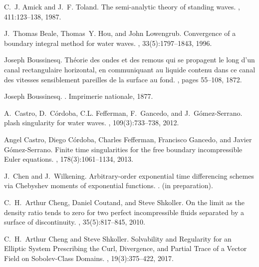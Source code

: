 \documentclass[11pt]{article}
\theoremstyle{plain}
\theoremstyle{definition}
\theoremstyle{definition}
\begin{document}
\begin{thebibliography}{10}
C.~J. Amick and J.~F. Toland.
\newblock The semi-analytic theory of standing waves.
, 411:123--138, 1987.

J.~Thomas Beale, Thomas~Y. Hou, and John Lowengrub.
\newblock Convergence of a boundary integral method for water waves.
, 33(5):1797--1843, 1996.

Joseph Boussinesq.
\newblock Th{\'e}orie des ondes et des remous qui se propagent le long d'un
  canal rectangulaire horizontal, en communiquant au liquide contenu dans ce
  canal des vitesses sensiblement pareilles de la surface au fond.
, pages
  55--108, 1872.

Joseph Boussinesq.
.
\newblock Imprimerie nationale, 1877.

A.~Castro, D.~C{\'o}rdoba, C.L. Fefferman, F.~Gancedo, and
  J.~G{\'o}mez-Serrano.
plash singularity for water waves.
,
  109(3):733--738, 2012.

Angel Castro, Diego C{\'o}rdoba, Charles Fefferman, Francisco Gancedo, and
  Javier G{\'o}mez-Serrano.
\newblock Finite time singularities for the free boundary incompressible
  {E}uler equations.
, 178(3):1061--1134, 2013.

J.~Chen and J.~Wilkening.
\newblock Arbitrary-order exponential time differencing schemes via {C}hebyshev
  moments of exponential functions.
.
\newblock (in preparation).

C.~H.~Arthur Cheng, Daniel Coutand, and Steve Shkoller.
\newblock On the limit as the density ratio tends to zero for two perfect
  incompressible fluids separated by a surface of discontinuity.
, 35(5):817--845, 2010.

C.~H.~Arthur Cheng and Steve Shkoller.
\newblock Solvability and {R}egularity for an {E}lliptic {S}ystem {P}rescribing
  the {C}url, {D}ivergence, and {P}artial {T}race of a {V}ector {F}ield on
  {S}obolev-{C}lass {D}omains.
, 19(3):375--422, 2017.


\end{thebibliography}
\end{document}
